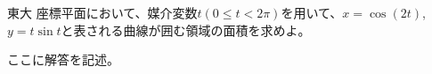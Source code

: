 \begin{thm}{43}{ \maru}{東大}
 座標平面において、媒介変数$t (0\le t< 2\pi)$を用いて、$x=\cos(2t)$, $y=t\sin t$と表される曲線が囲む領域の面積を求めよ。
\end{thm}

ここに解答を記述。